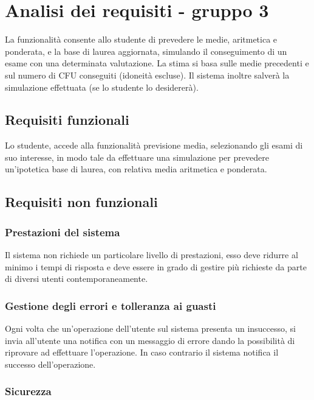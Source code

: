 
\chapter{Analisi dei requisiti - gruppo 3}
\label{ref:requisiti3}
La funzionalità consente allo studente di prevedere le medie, aritmetica e ponderata, e la base di laurea aggiornata, simulando il conseguimento di un esame con una determinata valutazione. La stima si basa sulle medie precedenti e sul numero di CFU conseguiti (idoneità escluse). Il sistema inoltre salverà la simulazione effettuata (se lo studente lo desidererà).

\section{Requisiti funzionali}

Lo studente, accede alla funzionalità previsione media, selezionando gli esami di suo interesse, in modo tale da effettuare una simulazione per prevedere un'ipotetica base di laurea, con relativa media aritmetica e ponderata.

\section{Requisiti non funzionali}

\subsection{Prestazioni del sistema} 

Il sistema non richiede un particolare livello di prestazioni, esso deve ridurre al minimo i tempi di risposta e deve essere in grado di gestire più richieste da parte di diversi utenti contemporaneamente.
\subsection{Gestione degli errori e tolleranza ai guasti}

Ogni volta che un’operazione dell’utente sul sistema presenta un insuccesso, si invia all’utente una notifica con un messaggio di errore dando la possibilità di riprovare ad effettuare l’operazione. In caso contrario il sistema notifica il successo dell’operazione.

\subsection{Sicurezza}

